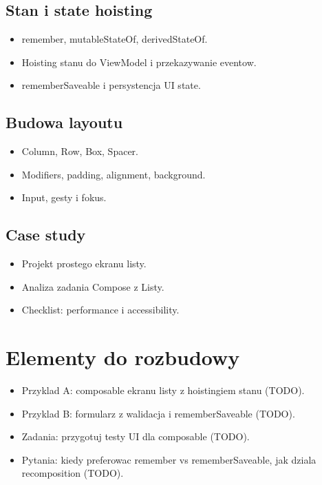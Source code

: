 \subsection{Stan i state hoisting}
\begin{itemize}
  \item remember, mutableStateOf, derivedStateOf.
  \item Hoisting stanu do ViewModel i przekazywanie eventow.
  \item rememberSaveable i persystencja UI state.
\end{itemize}

\subsection{Budowa layoutu}
\begin{itemize}
  \item Column, Row, Box, Spacer.
  \item Modifiers, padding, alignment, background.
  \item Input, gesty i fokus.
\end{itemize}

\subsection{Case study}
\begin{itemize}
  \item Projekt prostego ekranu listy.
  \item Analiza zadania Compose z Listy.
  \item Checklist: performance i accessibility.
\end{itemize}

\section{Elementy do rozbudowy}
\begin{itemize}
  \item Przyklad A: composable ekranu listy z hoistingiem stanu (TODO).
  \item Przyklad B: formularz z walidacja i rememberSaveable (TODO).
  \item Zadania: przygotuj testy UI dla composable (TODO).
  \item Pytania: kiedy preferowac remember vs rememberSaveable, jak dziala recomposition (TODO).
\end{itemize}


